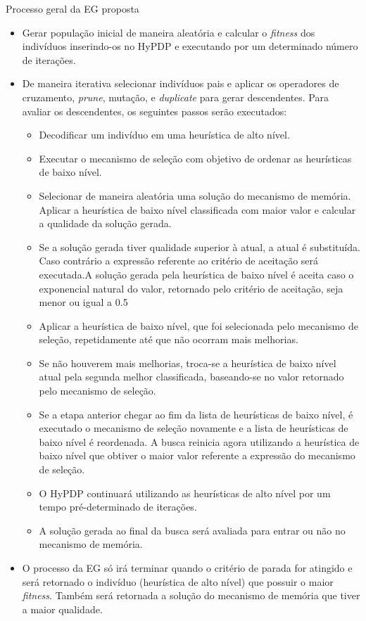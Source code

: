 \begin{frame}[allowframebreaks]{Processo geral da EG proposta}	
	
	\begin{itemize}
		\item Gerar população inicial de maneira aleatória e calcular o \textit{fitness} dos indivíduos inserindo-os no HyPDP e executando por um determinado número de iterações.
		\item De maneira iterativa selecionar indivíduos pais e aplicar os operadores
		de cruzamento, \textit{prune}, mutação, e \textit{duplicate} para gerar descendentes. Para avaliar os descendentes, os seguintes passos serão executados:
		\begin{itemize}
			\item Decodificar um indivíduo em uma  heurística de alto nível.
			\item Executar o mecanismo de seleção com objetivo de ordenar as heurísticas de baixo nível.
			\item Selecionar de maneira aleatória uma solução do mecanismo de memória. Aplicar a heurística de baixo nível classificada com maior valor e calcular a qualidade da solução gerada.
			\item Se a solução gerada tiver qualidade superior à atual, a atual é substituída. Caso contrário a expressão referente ao critério de aceitação será executada.A  solução gerada pela
			heurística de baixo nível é aceita caso o exponencial natural do valor, retornado pelo
			critério de aceitação, seja menor ou igual a 0.5
			\item Aplicar a heurística de baixo nível, que foi selecionada pelo mecanismo de seleção,
			repetidamente até que não ocorram mais melhorias.
			\item Se não houverem mais melhorias, troca-se a heurística de baixo nível atual pela
			segunda melhor classificada, baseando-se no valor retornado pelo mecanismo de
			seleção.
			\item Se a etapa anterior chegar ao fim da lista de heurísticas de baixo nível, é executado o
			mecanismo de seleção novamente e a lista de heurísticas de baixo nível é reordenada.
			A busca reinicia agora utilizando a heurística de baixo nível que obtiver o maior valor referente a expressão do mecanismo de seleção.
			\item O HyPDP continuará utilizando as heurísticas de alto
			nível por um tempo pré-determinado
			de iterações.
			\item A solução gerada ao final da busca será avaliada para
			entrar ou não no mecanismo de memória.
		\end{itemize}
		\item O processo da EG só irá terminar quando o critério de parada for atingido e será retornado o indivíduo (heurística de alto nível) que possuir o maior \textit{fitness}. Também será retornada a solução do mecanismo de memória que tiver a maior qualidade.
	\end{itemize}

\end{frame}



